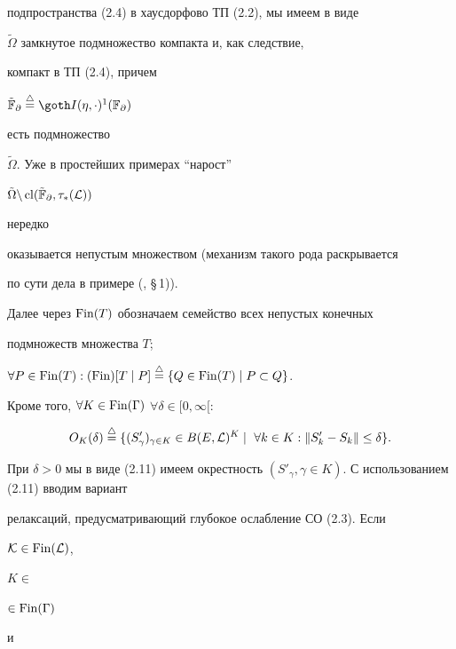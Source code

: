 подпространства (2.4) в хаусдорфово ТП (2.2), мы имеем в виде


$\tilde\Omega$ замкнутое подмножество компакта и, как следствие,


компакт в ТП (2.4), причем 


$\tilde {\Bbb F}_\partial \stac {\goth I}(\eta, \cdot)^1({\Bbb F}_\partial)$ 


есть подмножество


$\tilde\Omega$. Уже в простейших примерах ``нарост'' 


$\tilde\Omega \backslash \operatorname{cl} (\tilde {\Bbb F}_\partial, \tau_*({\cal L}))$ 


нередко


оказывается непустым множеством (механизм такого рода раскрывается


по сути дела в примере (\cite{Ch3}, \S\,1)).





Далее через $\operatorname{Fin}(T)$ обозначаем семейство всех непустых конечных


подмножеств множества $T$; 


$\forall P \in \Fin(T):(\Fin)[T \mid P]


\stac \{Q \in \Fin(T) \mid P \subset Q\}$. 


Кроме того, $\forall K \in


\Fin(\Gamma)$ $\forall \delta \in [0, \infty[:$


%


\begin{equation}


O_K(\delta) \stac \{(S'_\gamma)_{\gamma \in K} \in B\eL^K \mid \


\forall k \in K : \|S'_k - S_k\| \le \delta\}.


\end{equation}


%


При $\delta > 0$ мы в виде (2.11) имеем окрестность $(S'_\gamma,


\gamma \in K)$. С использованием (2.11) вводим вариант


релаксаций, предусматривающий глубокое ослабление СО (2.3). Если


${\cal K} \in \operatorname{Fin}({\cal L})$,


$K \in$\linebreak




$\in \operatorname{Fin}(\Gamma)$


и


